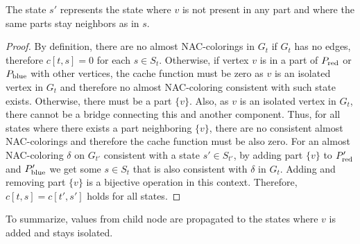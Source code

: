 %
The state \( s' \) represents the state where \( v \) is not present in any part
and where the same parts stay neighbors as in \( s \).
%
\begin{proof}
	By definition, there are no almost NAC-colorings
	in \( G_t \) if \( G_t \) has no edges,
	therefore \( c[t, s] = 0 \) for each \( s \in S_t \).
	Otherwise, if vertex \( v \) is in a part of \( P_{\text{red}} \) or \( P_{\text{blue}} \) with other vertices,
	the cache function must be zero as \( v \) is an isolated vertex in \( G_t \)
	and therefore no almost NAC-coloring consistent with such state exists.
	Otherwise, there must be a part \( \{v\} \).
	Also, as \( v \) is an isolated vertex in \( G_t \), there cannot be a bridge
	connecting this and another component.
	Thus, for all states where there exists
	a part neighboring \( \{v\} \), there are no consistent almost NAC-colorings
	and therefore the cache function must be also zero.
	For an almost NAC-coloring \( \delta \) on \( G_{t'} \) consistent with
	a state \( s' \in S_{t'} \),
	by adding part \( \{v\} \) to \( P_{\text{red}}' \) and \( P_{\text{blue}}' \)
	we get some \( s \in S_t \) that is also consistent with \( \delta \) in \( G_t \).
	Adding and removing part \( \{v\} \) is a bijective operation in this context.
	Therefore, \( c[t, s] = c[t', s'] \) holds for all states.
\end{proof}
%
To summarize, values from child node are propagated to the states
where \( v \) is added and stays isolated.

